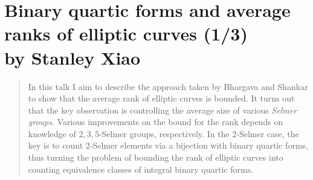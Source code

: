 \documentclass[12pt,amsfont]{amsart}
\begin{document}
\newpage
\section{Binary quartic forms and average ranks of elliptic curves (1/3) \\ by Stanley Xiao}

\begin{abstract} In this talk I aim to describe the approach taken by Bhargava and Shankar to show that the average rank of elliptic curves is bounded. It turns out that the key observation is controlling the average size of various \emph{Selmer groups}. Various improvements on the bound for the rank depends on knowledge of $2,3,5$-Selmer groups, respectively. In the $2$-Selmer case, the key is to count $2$-Selmer elements via a bijection with binary quartic forms, thus turning the problem of bounding the rank of elliptic curves into counting equivalence classes of integral binary quartic forms. 
\end{abstract}
\end{document}
